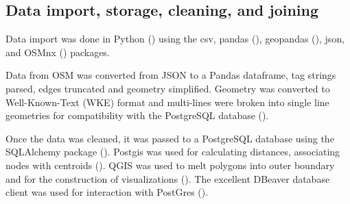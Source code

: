 \subsection{Data import, storage, cleaning, and joining}

Data import was done in Python (\cite{python}) using the csv, pandas (\cite{pandas}), geopandas (\cite{geopandas}), json, and OSMnx (\cite{osmnx}) packages. 

Data from OSM was converted from JSON to a Pandas dataframe, tag strings parsed, edges truncated and geometry simplified. Geometry was converted to Well-Known-Text (WKE) format and multi-lines were broken into single line geometries for compatibility with the PostgreSQL database (\cite{postgres}). 

Once the data was cleaned, it was passed to a PostgreSQL database using the SQLAlchemy package (\cite{bayer2010sqlalchemy}). Postgis was used for calculating distances, associating nodes with centroids (\cite{postgis}). QGIS was used to melt polygons into outer boundary and for the construction of visualizations (\cite{qgis}). The excellent DBeaver database client was used for interaction with PostGres (\cite{dbeaver}).